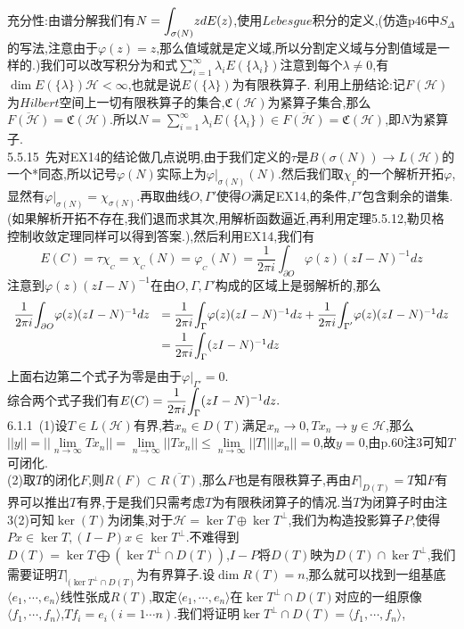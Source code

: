 \documentclass[b5paper]{ctexart}
\begin{document}
充分性:由谱分解我们有$N=\mathlarger{\int}_{\sigma(N)}zdE(z)$,使用$Lebesgue$积分的定义,(仿造p46中$S_{\Delta}$的写法,注意由于$\varphi(z)=z$,那么值域就是定义域,所以分割定义域与分割值域是一样的.)我们可以改写积分为和式$\sum\limits_{i=1}^{\infty}\lambda_iE(\{\lambda_i\})$注意到每个$\lambda\neq 0$,有$\dim E(\{\lambda\})\mathscr{H}<\infty$,也就是说$E(\{\lambda\})$为有限秩算子.
利用上册结论:记$F(\mathscr{H})$为$Hilbert$空间上一切有限秩算子的集合,$\mathfrak{C}(\mathscr{H})$为紧算子集合,那么$\overline{F(\mathscr{H})}=\mathfrak{C}(\mathscr{H}).$所以$N=\sum\limits_{i=1}^\infty \lambda_iE(\{\lambda_i\})\in \overline{F(\mathscr{H})}=\mathfrak{C}(\mathscr{H})$,即$N$为紧算子.\\
5.5.15~先对EX14的结论做几点说明,由于我们定义的$\tau$是$B(\sigma(N))\rightarrow L(\mathscr{H})$的一个*同态,所以记号$\varphi(N)$实际上为$\varphi|_{\sigma(N)}(N)$.然后我们取$ \chi_{_\Gamma}$的一个解析开拓$\varphi$,显然有$\varphi|_{\sigma(N)}=\chi_{\sigma(N)}$.再取曲线$O,\Gamma'$使得$O$满足EX14,的条件,$\Gamma'$包含剩余的谱集.(如果解析开拓不存在,我们退而求其次,用解析函数逼近,再利用定理5.5.12,勒贝格控制收敛定理同样可以得到答案.),然后利用EX14,我们有
\[E(C)=\tau \chi_{_C}=\chi_{_{C}}(N)=\varphi_{_C}(N)=\dfrac{1}{2\pi i}\int_{\partial O}\varphi(z) (zI-N)^{-1}dz\]
注意到$\varphi(z)(zI-N)^{-1}$在由$O,\Gamma,\Gamma'$构成的区域上是弱解析的,那么
\[
\begin{array}{rll}
\dfrac{1}{2\pi i}\mathlarger{\int}_{\partial O}\varphi(z) (zI-N)^{-1}dz& =\dfrac{1}{2\pi i}\mathlarger{\int}_{\Gamma}\varphi(z) (zI-N)^{-1}dz+\dfrac{1}{2\pi i}\mathlarger{\int}_{\Gamma'}\varphi(z) (zI-N)^{-1}dz\vspace{3pt}\\
&=\dfrac{1}{2\pi i}\mathlarger{\int}_{\Gamma}(zI-N)^{-1}dz
\end{array}\]
上面右边第二个式子为零是由于$\varphi|_{\Gamma'}=0$.\\
综合两个式子我们有$E(C)=\dfrac{1}{2\pi i}\mathlarger{\int}_{\Gamma}(zI-N)^{-1}dz.$\\
6.1.1~(1)设$T\in L(\mathscr{H})$有界,若$x_n\in D(T)$满足$x_n\rightarrow 0,Tx_n\rightarrow y\in \mathscr{H}$,那么$||y||=||\lim\limits_{n\to\infty}Tx_n||=\lim\limits_{n\to\infty}||Tx_n||\leq \lim\limits_{n\to\infty}||T||||x_n||=0$,故$y=0$,由p.60注3可知$T$可闭化.\\
(2)取$T$的闭化$F$,则$R(F)\subset \overline{R(T)}$,那么$F$也是有限秩算子,再由$F|_{D(T)}=T$知$F$有界可以推出$T$有界,于是我们只需考虑$T$为有限秩闭算子的情况.当$T$为闭算子时由注3(2)可知$\ker(T)$为闭集,对于$\mathscr{H}=\ker T\oplus \ker T^{\perp}$,我们为构造投影算子$P$,使得$Px\in \ker T,(I-P)x\in\ker T^{\perp}$.不难得到$D(T)=\ker T\bigoplus (\ker T^{\perp}\cap D(T))$,$I-P$将$D(T)$映为$D(T)\cap \ker T^{\perp}$,我们需要证明$T|_{(\ker T^{\perp}\cap D(T)}$为有界算子.设$\dim R(T)=n$,那么就可以找到一组基底$\langle e_1,\cdots,e_n\rangle$线性张成$R(T)$,取定$\langle e_1,\cdots,e_n\rangle$在$\ker T^{\perp}\cap D(T)$对应的一组原像$\langle f_1,\cdots,f_n\rangle$,$Tf_i=e_i(i=1\cdots n).$我们将证明$\ker T^{\perp}\cap D(T)=\langle f_1,\cdots,f_n\rangle$,
\end{document}
